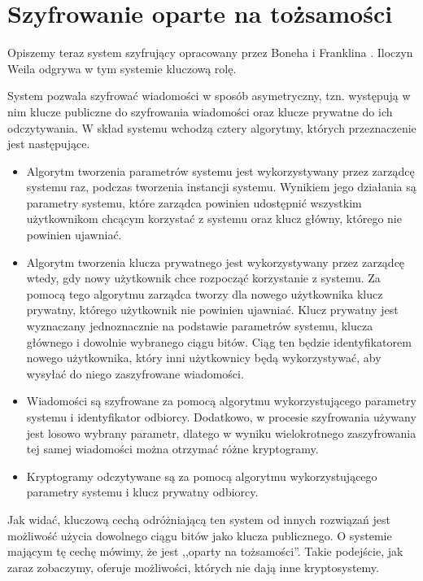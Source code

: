\section{Szyfrowanie oparte na tożsamości}

\noindent
Opiszemy teraz system szyfrujący
opracowany przez Boneha i Franklina \cite{bonehfranklin}.
Iloczyn Weila odgrywa w tym systemie kluczową rolę.

\noindent
System pozwala szyfrować wiadomości w sposób asymetryczny,
tzn. występują w nim klucze publiczne do szyfrowania wiadomości
oraz klucze prywatne do ich odczytywania.
W skład systemu wchodzą cztery algorytmy,
których przeznaczenie jest następujące.

\begin{itemize}
\item
Algorytm tworzenia parametrów systemu
jest wykorzystywany przez zarządcę systemu raz,
podczas tworzenia instancji systemu.
Wynikiem jego działania są parametry systemu,
które zarządca powinien udostępnić
wszystkim użytkownikom chcącym korzystać z systemu
oraz klucz główny, którego nie powinien ujawniać.

\item
Algorytm tworzenia klucza prywatnego
jest wykorzystywany przez zarządcę wtedy,
gdy nowy użytkownik chce rozpocząć korzystanie z systemu.
Za pomocą tego algorytmu zarządca
tworzy dla nowego użytkownika klucz prywatny,
którego użytkownik nie powinien ujawniać.
Klucz prywatny jest wyznaczany jednoznacznie
na podstawie parametrów systemu, klucza głównego
i dowolnie wybranego ciągu bitów.
Ciąg ten będzie identyfikatorem nowego użytkownika,
który inni użytkownicy będą wykorzystywać,
aby wysyłać do niego zaszyfrowane wiadomości.

\item
Wiadomości są szyfrowane za pomocą algorytmu wykorzystującego
parametry systemu i identyfikator odbiorcy.
Dodatkowo, w procesie szyfrowania używany jest losowo wybrany parametr,
dlatego w wyniku wielokrotnego zaszyfrowania tej samej wiadomości
można otrzymać różne kryptogramy.

\item
Kryptogramy odczytywane są za pomocą algorytmu wykorzystującego
parametry systemu i klucz prywatny odbiorcy.
\end{itemize}

\noindent
Jak widać, kluczową cechą odróżniającą ten system od innych rozwiązań
jest możliwość użycia dowolnego ciągu bitów jako klucza publicznego.
O systemie mającym tę cechę mówimy, że jest ,,oparty na tożsamości''.
Takie podejście, jak zaraz zobaczymy, oferuje możliwości,
których nie dają inne kryptosystemy.

